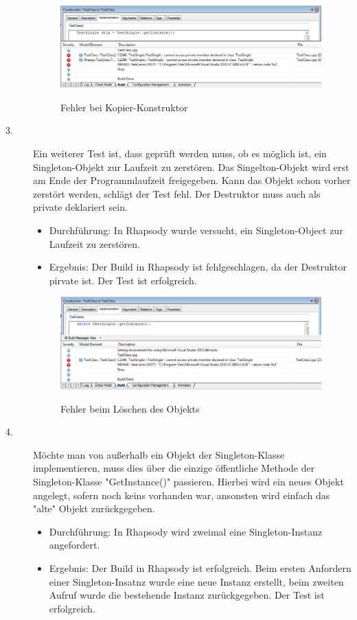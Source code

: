 \begin{description}
 \begin{figure}[!htbp]
	\centering
	\includegraphics[width=0.99\textwidth]{content/pictures/tests/singleton/KopierError1}
	\label{pic:bild}
	\caption{Fehler bei Kopier-Konstruktor}
\end{figure}
  
  \item[3.]
  Ein weiterer Test ist, dass geprüft werden muss, ob es möglich ist, ein Singleton-Objekt zur Laufzeit zu zerstören. Das Singelton-Objekt wird erst am Ende der Programmlaufzeit freigegeben. Kann das Objekt schon vorher zerstört werden, schlägt der Test fehl. Der Destruktor muss auch als private deklariert sein.
  \begin{itemize}
  	\item{Durchführung:}
  	In Rhapsody wurde versucht, ein Singleton-Object zur Laufzeit zu zerstören.
  	\item{Ergebnis:}
  	Der Build in Rhapsody ist fehlgeschlagen, da der Destruktor pirvate ist. Der
  	Test ist erfolgreich.
  \end{itemize}
  \begin{figure}[!htbp]
	\centering
	\includegraphics[width=0.99\textwidth]{content/pictures/tests/singleton/deleteError1}
	\label{pic:bild}
	\caption{Fehler beim Löschen des Objekts}
\end{figure}

  \item[4.]
  Möchte man von außerhalb ein Objekt der Singleton-Klasse implementieren, muss dies über die einzige öffentliche Methode der Singleton-Klasse "GetInstance()" passieren. Hierbei wird ein neues Objekt angelegt, sofern noch keins vorhanden war, ansonsten wird einfach das "alte" Objekt zurückgegeben.
  \begin{itemize}
  	\item{Durchführung:}
  	In Rhapsody wird zweimal eine Singleton-Instanz angefordert.
  	\item{Ergebnis:}
  	Der Build in Rhapsody ist erfolgreich. Beim ersten Anfordern einer
  	Singleton-Insatnz wurde eine neue Instanz erstellt, beim zweiten Aufruf wurde
  	die bestehende Instanz zurückgegeben.
  	Der Test ist erfolgreich.
  \end{itemize}
  

\end{description}
